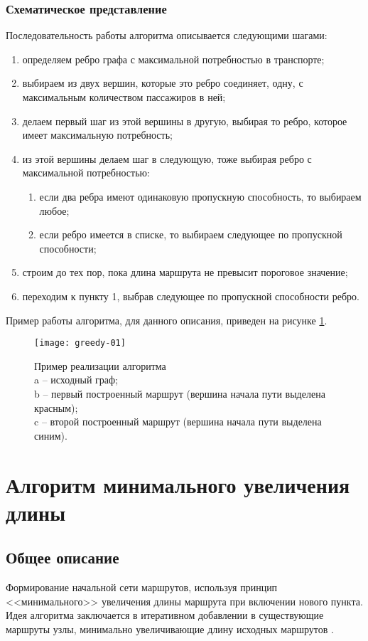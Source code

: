 \subsubsection{Схематическое представление}
Последовательность работы алгоритма описывается следующими шагами:
\begin{enumerate}
    \item определяем ребро графа с максимальной потребностью в транспорте;
    \item выбираем из двух вершин, которые это ребро соединяет, одну, с максимальным количеством 
        пассажиров в ней;
    \item делаем первый шаг из этой вершины в другую, выбирая то ребро, которое имеет максимальную 
        потребность;
    \item из этой вершины делаем шаг в следующую, тоже выбирая ребро с максимальной потребностью:
    \begin{enumerate}
        \item если два ребра имеют одинаковую пропускную способность, то выбираем любое;
        \item если ребро имеется в списке, то выбираем следующее по пропускной способности;
    \end{enumerate}
    \item строим до тех пор, пока длина маршрута не превысит пороговое значение;
    \item переходим к пункту 1, выбрав следующее по пропускной способности ребро.
\end{enumerate}

Пример работы алгоритма, для данного описания, приведен на рисунке \ref{img:greedy-01}.
\begin{figure}[h!]
    \centering
    \texttt{[image: greedy-01]}
    \caption{Пример реализации алгоритма\\
        a -- исходный граф;\\
        b -- первый построенный маршрут (вершина начала пути выделена красным);\\
        c -- второй построенный маршрут (вершина начала пути выделена синим).
    }
   \label{img:greedy-01}
\end{figure}

\section{Алгоритм минимального увеличения длины}\label{sec:second_alg}
\subsection{Общее описание}
Формирование начальной сети маршрутов, используя принцип <<минимального>> увеличения длины маршрута при 
включении нового пункта. Идея алгоритма заключается в итеративном добавлении в существующие маршруты узлы, 
минимально увеличивающие длину исходных маршрутов \cite{bib:20.2,bib:20.3}. 

